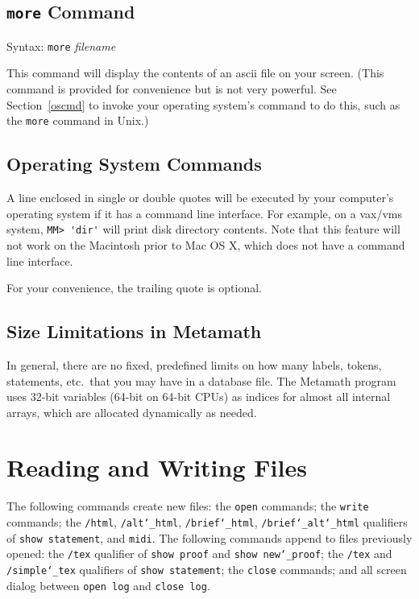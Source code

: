 \subsection{\texttt{more} Command}

Syntax:  \texttt{more} {\em filename}

This command will display the contents of an {\sc ascii} file on your
screen.  (This command is provided for convenience but is not very
powerful.  See Section~\ref{oscmd} to invoke your operating system's
command to do this, such as the \texttt{more} command in Unix.)

\subsection{Operating System Commands}\label{oscmd}

A line enclosed in single or double quotes will be executed by your
computer's operating system if it has a command line interface.  For
example, on a {\sc vax/vms} system,
\verb/MM> 'dir'/
will print disk directory contents.  Note that this feature will not
work on the Macintosh prior to Mac OS X, which does not have a command
line interface.

For your convenience, the trailing quote is optional.

\subsection{Size Limitations in Metamath}

In general, there are no fixed, predefined limits on how many labels, tokens, statements, etc.\ that
you may have in a database file.  The Metamath program uses 32-bit
variables (64-bit on 64-bit CPUs) as indices for almost all internal
arrays, which are allocated dynamically as needed.



\section{Reading and Writing Files}

The following commands create new files:  the \texttt{open} commands;
the \texttt{write} commands; the \texttt{/html},
\texttt{/alt{\char`\_}html}, \texttt{/brief{\char`\_}html},
\texttt{/brief{\char`\_}alt{\char`\_}html} qualifiers of \texttt{show
statement}, and \texttt{midi}.  The following commands append to files
previously opened:  the \texttt{/tex} qualifier of \texttt{show proof}
and \texttt{show new{\char`\_}proof}; the \texttt{/tex} and
\texttt{/simple{\char`\_}tex} qualifiers of \texttt{show statement}; the
\texttt{close} commands; and all screen dialog between \texttt{open log}
and \texttt{close log}.

